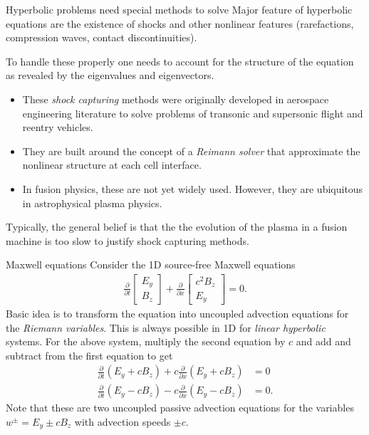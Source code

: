 \documentclass[pdf]{beamer}
\theoremstyle{definition}
\begin{document}
\begin{frame}{Hyperbolic problems need special methods to solve}
  Major feature of hyperbolic equations are the existence of shocks
  and other nonlinear features (rarefactions, compression waves,
  contact discontinuities).

  To handle these properly one needs to account for the structure of
  the equation as revealed by the eigenvalues and eigenvectors.
  \begin{itemize}
  \item These \emph{shock capturing} methods were originally developed
    in aerospace engineering literature to solve problems of transonic
    and supersonic flight and reentry vehicles.
  \item They are built around the concept of a \emph{Reimann solver}
    that approximate the nonlinear structure at each cell interface.
  \item In fusion physics, these are not yet widely used. However,
    they are ubiquitous in astrophysical plasma physics.
  \end{itemize}
  Typically, the general belief is that the the evolution of the
  plasma in a fusion machine is too slow to justify shock capturing
  methods. 
\end{frame}

\begin{frame}{Maxwell equations}
  \small
  Consider the 1D source-free Maxwell equations
  \begin{align*}
    \frac{\partial }{\partial t}
    \left[
    \begin{matrix}
      E_y \\
      B_z
    \end{matrix}
    \right]
    +
    \frac{\partial }{\partial x}
    \left[
    \begin{matrix}
      c^2B_z \\
      E_y
    \end{matrix}
    \right]
    =
    0.
  \end{align*}
  Basic idea is to transform the equation into uncoupled advection
  equations for the \emph{Riemann variables}. This is always possible
  in 1D for \emph{linear hyperbolic} systems. For the above system,
  multiply the second equation by $c$ and add and subtract from the
  first equation to get
  \begin{align*}
    \frac{\partial }{\partial t}\left(E_y + c B_z\right) + c \frac{\partial }{\partial x}\left(E_y + c B_z\right) &= 0 \\
    \frac{\partial }{\partial t}\left(E_y - c B_z\right) - c \frac{\partial }{\partial x}\left(E_y - c B_z\right) &= 0.
  \end{align*}
  Note that these are two uncoupled passive advection equations for
  the variables $w^\pm = E_y \pm c B_z$ with advection speeds $\pm
  c$.
\end{frame}
\end{document}
